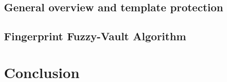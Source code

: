 \documentclass[11pt]{article}
\begin{document}
    \subsection{General overview and template protection}
    \subsection{Fingerprint Fuzzy-Vault Algorithm}
\section{Conclusion}

\singlespace
\nocite{*}

{}

\end{document}

